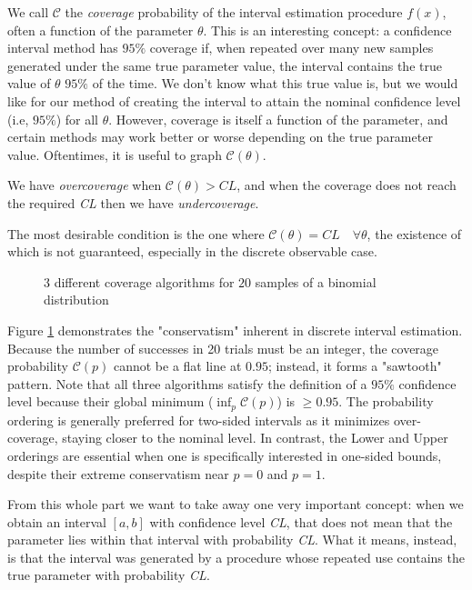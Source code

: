 We call $\mathcal{C}$ the \emph{coverage} probability of the interval estimation procedure $f(x)$, often a function of the parameter $\theta$. This is an interesting concept: a confidence interval method has $95\%$ coverage if, when repeated over many new samples generated under the same true parameter value, the interval contains the true value of $\theta$ $95\%$ of the time. We don't know what this true value is, but we would like for our method of creating the interval to attain the nominal confidence level (i.e, $95\%$) for all $\theta$. However, coverage is itself a function of the parameter, and certain methods may work better or worse depending on the true parameter value. Oftentimes, it is useful to graph $\mathcal{C}(\theta)$. 

We have \emph{overcoverage} when $\mathcal{C}(\theta)> CL$, and when the coverage does not reach the required \emph{CL} then we have \emph{undercoverage}. 

The most desirable condition is the one where $\mathcal{C}(\theta) = CL\quad \forall\theta$, the existence of which is not guaranteed, especially in the discrete observable case.

\begin{figure}[H]
	\centering
	
	\caption{3 different coverage algorithms for $20$ samples of a binomial distribution}
	\label{fig:binomial_coverage}
\end{figure}


Figure \ref{fig:binomial_coverage} demonstrates the "conservatism" inherent in discrete interval estimation. Because the number of successes in 20 trials must be an integer, the coverage probability $\mathcal{C}(p)$ cannot be a flat line at $0.95$; instead, it forms a "sawtooth" pattern. Note that all three algorithms satisfy the definition of a $95\%$ confidence level because their global minimum ($\inf_p \mathcal{C}(p)$) is $\ge 0.95$. The probability ordering is generally preferred for two-sided intervals as it minimizes over-coverage, staying closer to the nominal level. In contrast, the Lower and Upper orderings are essential when one is specifically interested in one-sided bounds, despite their extreme conservatism near $p=0$ and $p=1$.

From this whole part we want to take away one very important concept: when we obtain an interval $[a,b]$ with confidence level \emph{CL}, that does not mean that the parameter lies within that interval with probability \emph{CL}. What it means, instead, is that the interval was generated by a procedure whose repeated use contains the true parameter with probability \emph{CL}.

